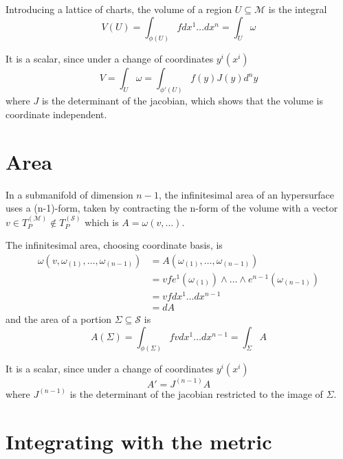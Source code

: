     Introducing a lattice of charts, the volume of a region $U \subseteq \mathcal M$ is the integral 
    \begin{equation*}
        V(U) = \int_{\phi(U)} f dx^1 \ldots dx^n = \int_U \omega 
    \end{equation*}

    It is a scalar, since under a change of coordinates $y^i(x^i)$
    \begin{equation*}
        V = \int_U \omega = \int_{\phi'(U)} f(y) J(y) d^n y
    \end{equation*}
    where $J$ is the determinant of the jacobian, which shows that the volume is coordinate independent. 

\section{Area}

    In a submanifold of dimension $n-1$, the infinitesimal area of an hypersurface uses a (n-1)-form, taken by contracting the n-form of the volume with a vector $v \in T_P^{(\mathcal M)} \notin T_P^{(\mathcal S)}$ which is $A = \omega(v, \ldots)$. 

    The infinitesimal area, choosing coordinate basis, is
    \begin{equation*}
    \begin{aligned}
        \omega (v, \omega_{(1)}, \ldots, \omega_{(n-1)}) & = A(\omega_{(1)}, \ldots, \omega_{(n-1)}) \\ & = v f e^1(\omega_{(1)}) \wedge \ldots \wedge e^{n-1} (\omega_{(n-1)}) \\ & = v f dx^1 \ldots dx^{n-1} \\ & = dA
    \end{aligned}
    \end{equation*}
    and the area of a portion $\Sigma \subseteq \mathcal S$ is 
    \begin{equation*}
        A(\Sigma) = \int_{\phi(\Sigma)} f v dx^1 \ldots dx^{n-1} = \int_{\Sigma} A
    \end{equation*}

    
    It is a scalar, since under a change of coordinates $y^i(x^i)$
    \begin{equation*}
        A' = J^{(n-1)}A
    \end{equation*}
    where $J^{(n-1)}$ is the determinant of the jacobian restricted to the image of $\Sigma$. 

\section{Integrating with the metric}

